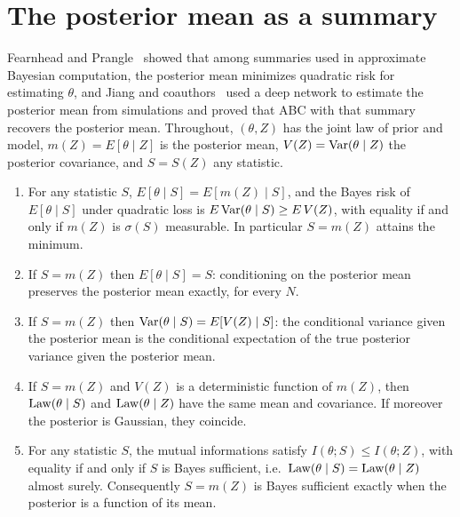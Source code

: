 \section{The posterior mean as a summary}\label{m:sec:jw}

Fearnhead and Prangle~\cite{fearnheadprangle2012} showed that among summaries used in approximate Bayesian computation, the posterior mean minimizes quadratic risk for estimating $\theta$, and Jiang and coauthors~\cite{jiang2017} used a deep network to estimate the posterior mean from simulations and proved that ABC with that summary recovers the posterior mean. Throughout, $(\theta,Z)$ has the joint law of prior and model, $m(Z)=E[\theta\mid Z]$ is the posterior mean, $V(Z)=\mathrm{Var}(\theta\mid Z)$ the posterior covariance, and $S=S(Z)$ any statistic.

\begin{theorem}\label{m:thm:jw}
\begin{enumerate}[label=(\roman*),nosep]
\item For any statistic $S$, $E[\theta\mid S]=E[m(Z)\mid S]$, and the Bayes risk of $E[\theta\mid S]$ under quadratic loss is $E\,\mathrm{Var}(\theta\mid S)\ge E\,V(Z)$, with equality if and only if $m(Z)$ is $\sigma(S)$ measurable. In particular $S=m(Z)$ attains the minimum.
\item If $S=m(Z)$ then $E[\theta\mid S]=S$: conditioning on the posterior mean preserves the posterior mean exactly, for every $N$.
\item If $S=m(Z)$ then $\mathrm{Var}(\theta\mid S)=E[V(Z)\mid S]$: the conditional variance given the posterior mean is the conditional expectation of the true posterior variance given the posterior mean.
\item If $S=m(Z)$ and $V(Z)$ is a deterministic function of $m(Z)$, then $\operatorname{Law}(\theta\mid S)$ and $\operatorname{Law}(\theta\mid Z)$ have the same mean and covariance. If moreover the posterior is Gaussian, they coincide.
\item For any statistic $S$, the mutual informations satisfy $I(\theta;S)\le I(\theta;Z)$, with equality if and only if $S$ is Bayes sufficient, i.e.\ $\operatorname{Law}(\theta\mid S)=\operatorname{Law}(\theta\mid Z)$ almost surely. Consequently $S=m(Z)$ is Bayes sufficient exactly when the posterior is a function of its mean.
\end{enumerate}
\end{theorem}

